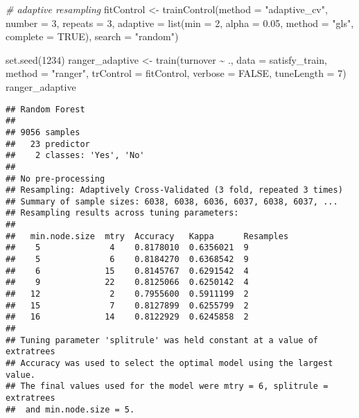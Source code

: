 \documentclass[
]{book}
\newenvironment{Shaded}{\begin{snugshade}}{\end{snugshade}}
\newcommand{\AttributeTok}[1]{\textcolor[rgb]{0.77,0.63,0.00}{#1}}
\newcommand{\CommentTok}[1]{\textcolor[rgb]{0.56,0.35,0.01}{\textit{#1}}}
\newcommand{\ConstantTok}[1]{\textcolor[rgb]{0.00,0.00,0.00}{#1}}
\newcommand{\DecValTok}[1]{\textcolor[rgb]{0.00,0.00,0.81}{#1}}
\newcommand{\FloatTok}[1]{\textcolor[rgb]{0.00,0.00,0.81}{#1}}
\newcommand{\FunctionTok}[1]{\textcolor[rgb]{0.00,0.00,0.00}{#1}}
\newcommand{\NormalTok}[1]{#1}
\newcommand{\OtherTok}[1]{\textcolor[rgb]{0.56,0.35,0.01}{#1}}
\newcommand{\SpecialCharTok}[1]{\textcolor[rgb]{0.00,0.00,0.00}{#1}}
\newcommand{\StringTok}[1]{\textcolor[rgb]{0.31,0.60,0.02}{#1}}
\begin{document}
\begin{Shaded}
\begin{Highlighting}[]
\CommentTok{\# adaptive resampling}
\NormalTok{fitControl }\OtherTok{\textless{}{-}} \FunctionTok{trainControl}\NormalTok{(}\AttributeTok{method =} \StringTok{"adaptive\_cv"}\NormalTok{, }
                           \AttributeTok{number =} \DecValTok{3}\NormalTok{, }\AttributeTok{repeats =} \DecValTok{3}\NormalTok{,}
                           \AttributeTok{adaptive =} \FunctionTok{list}\NormalTok{(}\AttributeTok{min =} \DecValTok{2}\NormalTok{,}
                                           \AttributeTok{alpha =} \FloatTok{0.05}\NormalTok{,}
                                           \AttributeTok{method =} \StringTok{"gls"}\NormalTok{,}
                                           \AttributeTok{complete =} \ConstantTok{TRUE}\NormalTok{),}
                           \AttributeTok{search =} \StringTok{"random"}\NormalTok{)}

\FunctionTok{set.seed}\NormalTok{(}\DecValTok{1234}\NormalTok{)}
\NormalTok{ranger\_adaptive }\OtherTok{\textless{}{-}} \FunctionTok{train}\NormalTok{(turnover }\SpecialCharTok{\textasciitilde{}}\NormalTok{ ., }\AttributeTok{data =}\NormalTok{ satisfy\_train, }
                         \AttributeTok{method =} \StringTok{"ranger"}\NormalTok{, }
                         \AttributeTok{trControl =}\NormalTok{ fitControl,}
                         \AttributeTok{verbose =} \ConstantTok{FALSE}\NormalTok{,}
                         \AttributeTok{tuneLength =} \DecValTok{7}\NormalTok{)}
\NormalTok{ranger\_adaptive}
\end{Highlighting}
\end{Shaded}

\begin{verbatim}
## Random Forest 
## 
## 9056 samples
##   23 predictor
##    2 classes: 'Yes', 'No' 
## 
## No pre-processing
## Resampling: Adaptively Cross-Validated (3 fold, repeated 3 times) 
## Summary of sample sizes: 6038, 6038, 6036, 6037, 6038, 6037, ... 
## Resampling results across tuning parameters:
## 
##   min.node.size  mtry  Accuracy   Kappa      Resamples
##    5              4    0.8178010  0.6356021  9        
##    5              6    0.8184270  0.6368542  9        
##    6             15    0.8145767  0.6291542  4        
##    9             22    0.8125066  0.6250142  4        
##   12              2    0.7955600  0.5911199  2        
##   15              7    0.8127899  0.6255799  2        
##   16             14    0.8122929  0.6245858  2        
## 
## Tuning parameter 'splitrule' was held constant at a value of extratrees
## Accuracy was used to select the optimal model using the largest value.
## The final values used for the model were mtry = 6, splitrule = extratrees
##  and min.node.size = 5.
\end{verbatim}
\end{document}
